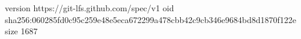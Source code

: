 version https://git-lfs.github.com/spec/v1
oid sha256:060285fd0c95c259e48e5eca672299a478cbb42c9cb346e9684bd8d1870f122e
size 1687
